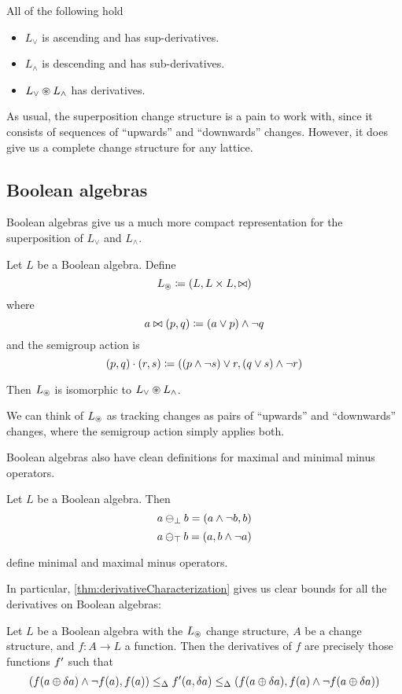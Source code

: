 \begin{prop}
  All of the following hold
  \begin{itemize}
    \item $L_\vee$ is ascending and has sup-derivatives.
    \item $L_\wedge$ is descending and has sub-derivatives.
    \item $L_\vee \circledast L_\wedge$ has derivatives.
  \end{itemize}
\end{prop}

As usual, the superposition change structure is a pain to work with, since it
consists of sequences of ``upwards'' and ``downwards'' changes. However, it does
give us a complete change structure for any lattice.

\subsection{Boolean algebras}

Boolean algebras give us a much more compact representation for the
superposition of $L_\vee$ and $L_\wedge$.

\begin{prop}
  Let $L$ be a Boolean algebra. Define
  $$L_\circledast \coloneqq (L,L \times L,\bowtie)$$
  where
  $$a \bowtie (p, q) \coloneqq (a \vee p) \wedge \neg q$$
  and the semigroup action is
  $$(p, q) \cdot (r, s) \coloneqq ((p \wedge \neg s) \vee r, (q \vee s) \wedge \neg r)$$

  Then $L_\circledast$ is isomorphic to $L_\vee \circledast L_\wedge$.
\end{prop}

We can think of $L_\circledast$ as tracking changes as pairs of ``upwards'' and
``downwards'' changes, where the semigroup action simply applies both.

Boolean algebras also have clean definitions for maximal and minimal minus
operators.

\begin{prop}
  Let $L$ be a Boolean algebra. Then
  $$a \ominus_\bot b = (a \wedge \neg b, b)$$
  $$a \ominus_\top b = (a, b \wedge \neg a)$$

  define minimal and maximal minus operators.
\end{prop}

In particular, \ref{thm:derivativeCharacterization} gives us clear bounds for
all the derivatives on Boolean algebras:

\begin{corollary}
  Let $L$ be a Boolean algebra with the $L_\circledast$ change structure, $A$ be
  a change structure, and $f: A \rightarrow
  L$ a function. Then the derivatives of $f$ are precisely those functions
  $f'$ such that
  $$
  (
    f(a \oplus \delta a) \wedge \neg f(a), 
    f(a)
  )
  \leq_\Delta
  f'(a, \delta a)
  \leq_\Delta
  (
    f(a \oplus \delta a), 
    f(a) \wedge \neg f(a \oplus \delta a)
  )
  $$
\end{corollary}

